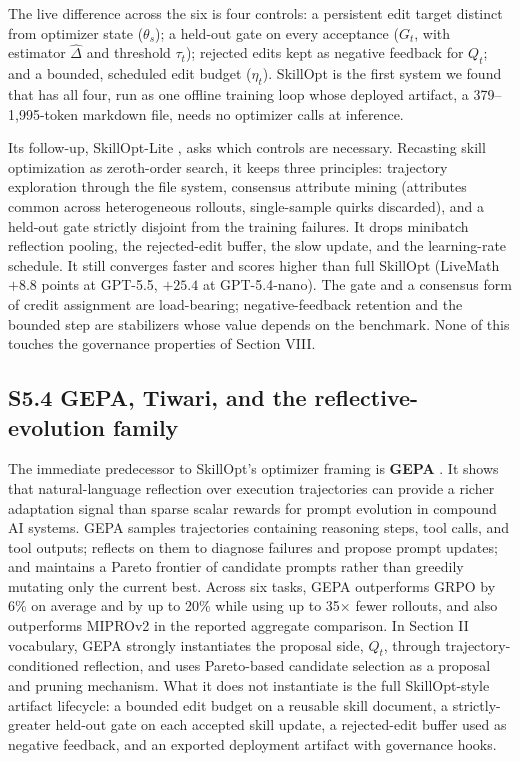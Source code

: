 \documentclass[
]{article}
\begin{document}
The live difference across the six is four controls: a persistent edit
target distinct from optimizer state (\(\theta_s\)); a held-out gate on
every acceptance (\(G_t\), with estimator \(\widehat\Delta\) and
threshold \(\tau_t\)); rejected edits kept as negative feedback for
\(Q_t\); and a bounded, scheduled edit budget (\(\eta_t\)). SkillOpt is
the first system we found that has all four, run as one offline training
loop whose deployed artifact, a 379--1,995-token markdown file, needs no
optimizer calls at inference.

Its follow-up, SkillOpt-Lite \cite{shen2026skilloptlite}, asks which
controls are necessary. Recasting skill optimization as zeroth-order
search, it keeps three principles: trajectory exploration through the
file system, consensus attribute mining (attributes common across
heterogeneous rollouts, single-sample quirks discarded), and a held-out
gate strictly disjoint from the training failures. It drops minibatch
reflection pooling, the rejected-edit buffer, the slow update, and the
learning-rate schedule. It still converges faster and scores higher than
full SkillOpt (LiveMath \(+8.8\) points at GPT-5.5, \(+25.4\) at
GPT-5.4-nano). The gate and a consensus form of credit assignment are
load-bearing; negative-feedback retention and the bounded step are
stabilizers whose value depends on the benchmark. None of this touches
the governance properties of Section VIII.

\subsection{S5.4 GEPA, Tiwari, and the reflective-evolution
family}\label{s5.4-gepa-tiwari-and-the-reflective-evolution-family}

The immediate predecessor to SkillOpt's optimizer framing is
\textbf{GEPA} \cite{agrawal2025gepa}. It shows that natural-language
reflection over execution trajectories can provide a richer adaptation
signal than sparse scalar rewards for prompt evolution in compound AI
systems. GEPA samples trajectories containing reasoning steps, tool
calls, and tool outputs; reflects on them to diagnose failures and
propose prompt updates; and maintains a Pareto frontier of candidate
prompts rather than greedily mutating only the current best. Across six
tasks, GEPA outperforms GRPO by 6\% on average and by up to 20\% while
using up to 35× fewer rollouts, and also outperforms MIPROv2 in the
reported aggregate comparison. In Section II vocabulary, GEPA strongly
instantiates the proposal side, \(Q_t\), through trajectory-conditioned
reflection, and uses Pareto-based candidate selection as a proposal and
pruning mechanism. What it does not instantiate is the full
SkillOpt-style artifact lifecycle: a bounded edit budget on a reusable
skill document, a strictly-greater held-out gate on each accepted skill
update, a rejected-edit buffer used as negative feedback, and an
exported deployment artifact with governance hooks.
\end{document}
